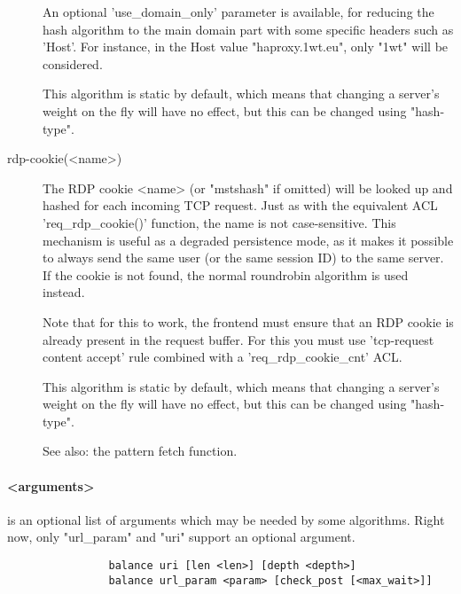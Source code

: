 \begin{description}
                  An optional 'use\_domain\_only' parameter is available, for
                  reducing the hash algorithm to the main domain part with some
                  specific headers such as 'Host'. For instance, in the Host
                  value "haproxy.1wt.eu", only "1wt" will be considered.

                  This algorithm is static by default, which means that
                  changing a server's weight on the fly will have no effect,
                  but this can be changed using "hash-type".

      \item[rdp-cookie(<name>)]
                  The RDP cookie <name> (or "mstshash" if omitted) will be
                  looked up and hashed for each incoming TCP request. Just as
                  with the equivalent ACL 'req\_rdp\_cookie()' function, the name
                  is not case-sensitive. This mechanism is useful as a degraded
                  persistence mode, as it makes it possible to always send the
                  same user (or the same session ID) to the same server. If the
                  cookie is not found, the normal roundrobin algorithm is
                  used instead.

                  Note that for this to work, the frontend must ensure that an
                  RDP cookie is already present in the request buffer. For this
                  you must use 'tcp-request content accept' rule combined with
                  a 'req\_rdp\_cookie\_cnt' ACL.

                  This algorithm is static by default, which means that
                  changing a server's weight on the fly will have no effect,
                  but this can be changed using "hash-type".

                  See also: the  pattern fetch function.
       \end{description}

    \paragraph*{<arguments>}
                is an optional list of arguments which may be needed by some
                algorithms. Right now, only "url\_param" and "uri" support an
                optional argument.

                \begin{verbatim}
                balance uri [len <len>] [depth <depth>]
                balance url_param <param> [check_post [<max_wait>]]
                \end{verbatim}

